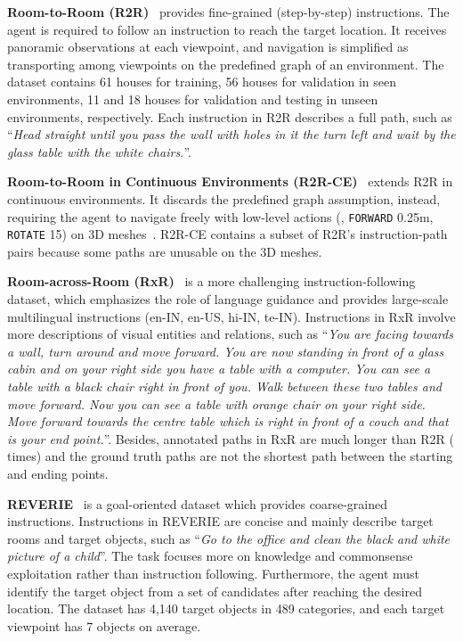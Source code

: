 \vspace{1mm}
\noindent\textbf{Room-to-Room (R2R)}~\cite{anderson2018vision} provides fine-grained (step-by-step) instructions. 
The agent is required to follow an instruction to reach the target location.
It receives panoramic observations at each viewpoint, and navigation is simplified as transporting among viewpoints on the predefined graph of an environment. 
The dataset contains 61 houses for training, 56 houses for validation in seen environments, 11 and 18 houses for validation and testing in unseen environments, respectively. 
Each instruction in R2R describes a full path, such as ``\textit{Head straight until you pass the wall with holes in it the turn left and wait by the glass table with the white chairs.}''.


\vspace{1mm}
\noindent\textbf{Room-to-Room in Continuous Environments (R2R-CE)}~\cite{krantz2020beyond} extends R2R in continuous environments.
It discards the predefined graph assumption, instead, requiring the agent to navigate freely with low-level actions (\eg, \texttt{FORWARD} 0.25m, \texttt{ROTATE} 15\degree) on 3D meshes~\cite{savva2019habitat}. 
R2R-CE contains a subset of R2R's instruction-path pairs because some paths are unusable on the 3D meshes. 


\vspace{1mm}
\noindent\textbf{Room-across-Room (RxR)}~\cite{ku2020room} is a more challenging instruction-following dataset, which emphasizes the role of language guidance and provides large-scale multilingual instructions (en-IN, en-US, hi-IN, te-IN). 
Instructions in RxR involve more descriptions of visual entities and relations, such as ``\textit{You are facing towards a wall, turn around and move forward. You are now standing in front of a glass cabin and on your right side you have a table with a computer. You can see a table with a black chair right in front of you. Walk between these two tables and move forward. Now you can see a table with orange chair on your right side. Move forward towards the centre table which is right in front of a couch and that is your end point.}''.
Besides, annotated paths in RxR are much longer than R2R ( times) and the ground truth paths are not the shortest path between the starting and ending points.



\vspace{1mm}
\noindent\textbf{REVERIE}~\cite{qi2020reverie} is a goal-oriented dataset which provides coarse-grained instructions. 
Instructions in REVERIE are concise and mainly describe target rooms and target objects, such as ``\textit{Go to the office and clean the black and white picture of a child}''. 
The task focuses more on knowledge and commonsense exploitation rather than instruction following. 
Furthermore, the agent must identify the target object from a set of candidates after reaching the desired location.
The dataset has 4,140 target objects in 489 categories, and each target viewpoint has 7 objects on average. 



